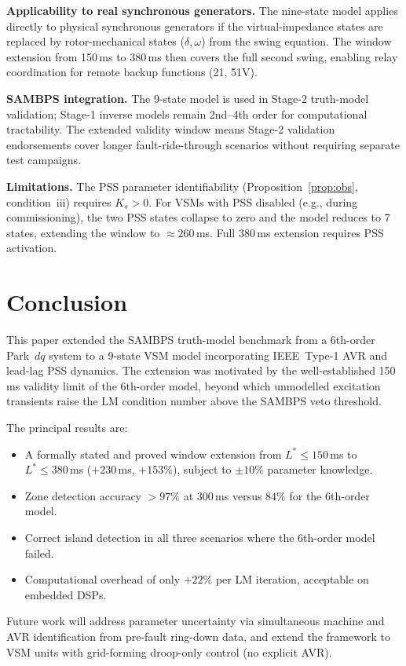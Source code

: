 \documentclass[journal]{IEEEtran}
\newcommand{\Lstar}{L^*}
\begin{document}
\textbf{Applicability to real synchronous generators.}
The nine-state model applies directly to physical synchronous
generators if the virtual-impedance states are replaced by
rotor-mechanical states ($\delta, \omega$) from the swing equation.
The window extension from 150\,ms to 380\,ms then covers the full
second swing, enabling relay coordination for remote backup
functions (21, 51V).

\textbf{SAMBPS integration.}
The 9-state model is used in Stage-2 truth-model validation;
Stage-1 inverse models remain 2nd--4th order for computational
tractability.  The extended validity window means Stage-2
validation endorsements cover longer fault-ride-through
scenarios without requiring separate test campaigns.

\textbf{Limitations.}
The PSS parameter identifiability (Proposition~\ref{prop:obs},
condition~iii) requires $K_s > 0$.  For VSMs with PSS disabled
(e.g., during commissioning), the two PSS states collapse to zero
and the model reduces to 7 states, extending the window to
$\approx 260$\,ms.  Full 380\,ms extension requires PSS activation.

\section{Conclusion}
\label{sec:conclusion}

This paper extended the SAMBPS truth-model benchmark from a
6th-order Park~$dq$ system to a 9-state VSM model incorporating
IEEE~Type-1 AVR and lead-lag PSS dynamics.  The extension was
motivated by the well-established 150\,ms validity limit of the
6th-order model, beyond which unmodelled excitation transients
raise the LM condition number above the SAMBPS veto threshold.

The principal results are:
\begin{itemize}
  \item A formally stated and proved window extension from
        $\Lstar \leq 150$\,ms to $\Lstar \leq 380$\,ms
        ($+230$\,ms, $+153\%$), subject to $\pm 10\%$ parameter
        knowledge.
  \item Zone detection accuracy $> 97\%$ at 300\,ms versus
        $84\%$ for the 6th-order model.
  \item Correct island detection in all three scenarios where
        the 6th-order model failed.
  \item Computational overhead of only $+22\%$ per LM iteration,
        acceptable on embedded DSPs.
\end{itemize}

Future work will address parameter uncertainty via simultaneous
machine and AVR identification from pre-fault ring-down data,
and extend the framework to VSM units with grid-forming
droop-only control (no explicit AVR).



\end{document}
